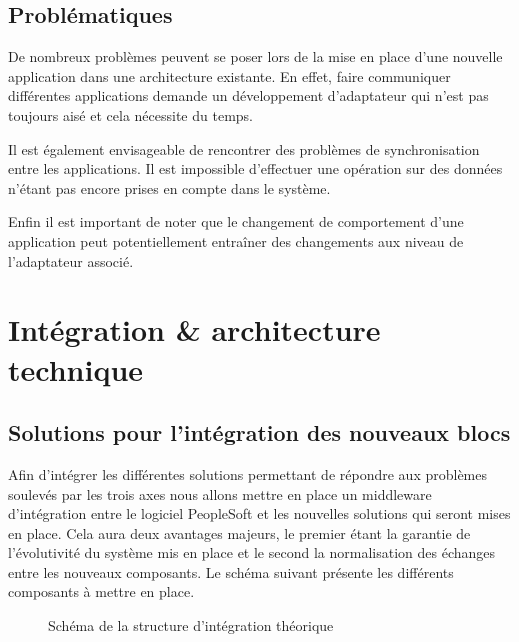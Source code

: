 \subsection{Problématiques}

De nombreux problèmes peuvent se poser lors de la mise en place d’une nouvelle application dans une architecture existante. En effet, faire communiquer différentes applications demande un développement d’adaptateur qui n’est pas toujours aisé et cela nécessite du temps. 

Il est également envisageable de rencontrer des problèmes de synchronisation entre les applications. Il est impossible d’effectuer une opération sur des données n’étant pas encore prises en compte dans le système.

Enfin il est important de noter que le changement de comportement d’une application peut potentiellement entraîner des changements aux niveau de l’adaptateur associé.

\section{Intégration \& architecture technique}

\subsection{Solutions pour l’intégration des nouveaux blocs}

Afin d’intégrer les différentes solutions permettant de répondre aux problèmes soulevés par les trois axes nous allons mettre en place un middleware d’intégration entre le logiciel PeopleSoft et les nouvelles solutions qui seront mises en place. Cela aura deux avantages majeurs, le premier étant la garantie de l’évolutivité du système mis en place et le second la normalisation des échanges entre les nouveaux composants. Le schéma suivant présente les différents composants à mettre en place.

\begin{figure}[H]
    \label{fig-bus-theo}
    \noindent{}
    \caption{Schéma de la structure d'intégration théorique}
\end{figure}

